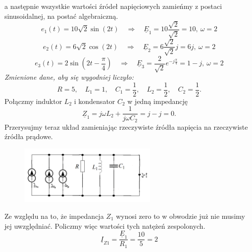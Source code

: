 \documentclass[12pt, a4paper]{article}
\begin{document}
\begin{enumerate}[label=\alph*)]
\begin{figure}[H]
        \end{figure}
        a następnie wszystkie wartości źródeł napięciowych zamieńmy z postaci sinusoidalnej,
        na postać algebraiczną.
        \begin{equation*}
          e_1(t) = 10\sqrt{2}\sin(2t) \quad \Rightarrow \quad
          \underline{E}_1 = 10\frac{\sqrt{2}}{\sqrt{2}} = 10, \: \omega = 2
        \end{equation*}
        \begin{equation*}
          e_2(t) = 6\sqrt{2}\cos(2t) \quad \Rightarrow \quad
          \underline{E}_2 = 6\frac{\sqrt{2}}{\sqrt{2}}j = 6j, \: \omega = 2
        \end{equation*}
        \begin{equation*}
          e_3(t) = 2\sin\left(2t-\frac{\pi}{4}\right) \quad \Rightarrow \quad
          \underline{E}_3 = \frac{2}{\sqrt{2}}e^{-j\frac{\pi}{4}} = 1-j, \: \omega = 2
        \end{equation*}
        \textit{Zmienione dane, aby się wygodniej liczyło:}
        \begin{equation*}
          R = 5, \quad L_1 = 1, \quad C_1 = \frac{1}{2}, \quad L_2 = \frac{1}{2},
          \quad C_2 = \frac{1}{2}.
        \end{equation*}
        Połączmy induktor $L_2$ i kondensator $C_2$ w jedną impedancję
        \begin{equation*}
          \underline{Z}_1 = j\omega L_2 + \frac{1}{j\omega C_2} = j-j = 0.
        \end{equation*}
        Przerysujmy teraz układ zamieniając rzeczywiste źródła napięcia na rzeczywiste
        źródła prądowe.
        \begin{figure}[H]
          \centering
          \includegraphics[width = 0.6\textwidth]{./images/Lista_3/3.4.3.png}
        \end{figure}
        Ze względu na to, że impedancja $Z_1$ wynosi zero to w obwodzie już nie musimy jej
        uwzględniać. Policzmy więc wartości tych natężeń zespolonych.
        \begin{equation*}
          \underline{I}_{Z1} = \frac{\underline{E}_1}{R_1} = \frac{10}{5} = 2

\end{equation*}
\end{enumerate}
\end{document}

